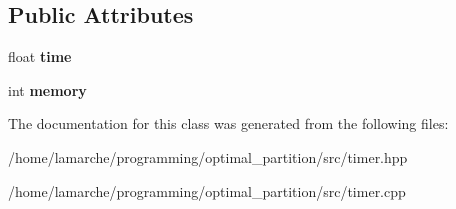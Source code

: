 \subsection*{Public Attributes}
\begin{DoxyCompactItemize}
\item 
\hypertarget{classTimer_a6c45df1d084a18e41e3a35f6a43df0be}{float {\bfseries time}}\label{classTimer_a6c45df1d084a18e41e3a35f6a43df0be}

\item 
\hypertarget{classTimer_adbb859c7553e9986b41fe6ca0dee1913}{int {\bfseries memory}}\label{classTimer_adbb859c7553e9986b41fe6ca0dee1913}

\end{DoxyCompactItemize}


The documentation for this class was generated from the following files\-:\begin{DoxyCompactItemize}
\item 
/home/lamarche/programming/optimal\-\_\-partition/src/timer.\-hpp\item 
/home/lamarche/programming/optimal\-\_\-partition/src/timer.\-cpp\end{DoxyCompactItemize}
